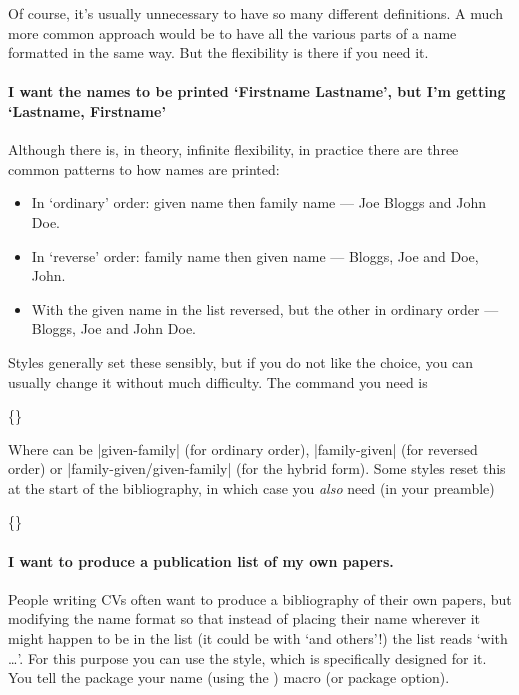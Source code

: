 Of course, it's usually unnecessary to have so many different
definitions. A much more common approach would be to have all the
various parts of a name formatted in the same way. But the flexibility
is there if you need it.

\paragraph{I want the names to be printed `Firstname Lastname', but
  I'm getting `Lastname, Firstname'} Although there is, in theory,
infinite flexibility, in practice there are three common patterns to
how names are printed:
\begin{itemize}
\item In `ordinary' order: given name then family name --- Joe Bloggs
  and John Doe.
\item In `reverse' order: family name then given name --- Bloggs, Joe
  and Doe, John.
\item With the given name in the list reversed, but the other in
  ordinary order --- Bloggs, Joe and John Doe.
\end{itemize}
Styles generally set these sensibly, but if you do not like the
choice, you can usually change it without much difficulty. The command
you need is
\begin{pseudoverb}
  \{\}
\end{pseudoverb}
Where  can be |given-family| (for ordinary order),
|family-given| (for reversed order) or |family-given/given-family| (for the
hybrid form). Some styles reset this at the start of the bibliography,
in which case you \emph{also} need (in your preamble)
\begin{pseudoverb}
\{\}
\end{pseudoverb}

\paragraph{I want to produce a publication list of my own papers.}
People writing CVs often want to produce a bibliography of their own
papers, but modifying the name format so that instead of placing their
name wherever it might happen to be in the list (it could be with `and
others'!) the list reads `with \ldots'. For this purpose you can use
the  style, which is specifically designed
for it. You tell the package your name (using the ) macro
(or package option).

